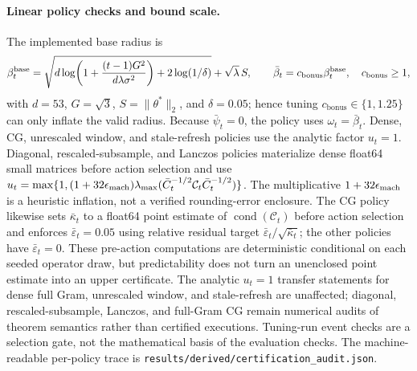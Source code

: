 \documentclass[twoside]{article}
\newcommand{\cbonus}{c_{\mathrm{bonus}}} %
\begin{document}
\paragraph{Linear policy checks and bound scale.}
The implemented base radius is
\[
 \beta_t^{\rm base}=
 \sqrt{d\log\!\left(1+\frac{(t-1)G^2}{d\lambda\sigma^2}\right)
       +2\log(1/\delta)}+\sqrt{\lambda}\,S,
 \qquad
 \bar\beta_t=\cbonus\beta_t^{\rm base},\quad \cbonus\ge1,
\]
with $d=53$, $G=\sqrt3$, $S=\|\theta^*\|_2$, and $\delta=0.05$; hence tuning
$\cbonus\in\{1,1.25\}$ can only inflate the valid radius.  Because
$\bar\psi_t=0$, the policy uses $\omega_t=\bar\beta_t$.  Dense, CG, unrescaled
window, and stale-refresh policies use the analytic factor $u_t=1$.
Diagonal, rescaled-subsample, and Lanczos policies materialize dense float64 small
matrices before action selection and use
$u_t=\max\{1,(1+32\epsilon_{\rm mach})
\lambda_{\max}(\bar C_t^{-1/2}\mathcal C_t\bar C_t^{-1/2})\}$.
The multiplicative $1+32\epsilon_{\rm mach}$ is a heuristic inflation, not a
verified rounding-error enclosure.  The CG policy likewise sets
$\bar\kappa_t$ to a float64 point estimate of
$\operatorname{cond}(\mathcal C_t)$ before action selection and enforces
$\bar\varepsilon_t=0.05$ using
relative residual target $\bar\varepsilon_t/\sqrt{\bar\kappa_t}$; the other
policies have $\bar\varepsilon_t=0$.  These pre-action computations are
deterministic conditional on each seeded operator draw, but predictability does
not turn an unenclosed point estimate into an upper certificate.  The analytic
$u_t=1$ transfer statements for dense full Gram, unrescaled window, and
stale-refresh are unaffected; diagonal, rescaled-subsample, Lanczos, and full-Gram
CG remain numerical audits of theorem semantics rather than certified executions.
Tuning-run event checks are a selection gate, not the mathematical basis of the
evaluation checks.  The machine-readable per-policy trace is
\nolinkurl{results/derived/certification_audit.json}.

\begin{table}[t]
\centering\small

\caption{Fixed-reference linear RHS-to-regret ratio
$\mathrm{RHS}/R_T$.  The JSON artifact also records $R_T$, RHS, $R_T/T$, and
RHS$/T$ at every horizon for both fixed and tuned configurations.  Every displayed
RHS exceeds $T$ times the exact maximum one-round pseudo-regret $0.8118$ on the
finite context support, so the reported RHS values are numerically vacuous.  For
the four affected policies they are not rigorously certified bounds because their
spectral point estimates lack verified upper enclosures.}
\label{tab:linear-bound-ratios}
\end{table}
\end{document}

